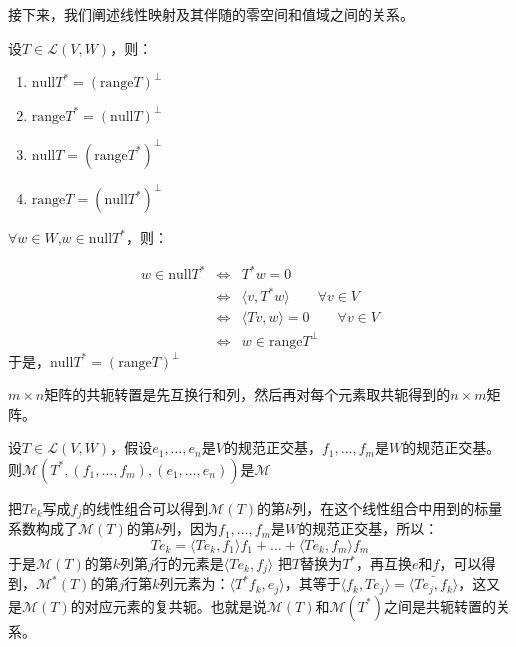 \documentclass[10pt,a4paper,UTF8]{article}
\begin{document}
接下来，我们阐述线性映射及其伴随的零空间和值域之间的关系。
\begin{tikztheorem}
设\(T\in \mathcal{L}(V,W)\)，则：
\begin{enumerate}
\item \(\mathrm{null} T^{*} = (\mathrm{range}T)^{\bot}\)
\item \(\mathrm{range}T^{*} = (\mathrm{null}T)^{\bot}\)
\item \(\mathrm{null}T = (\mathrm{range}T^{*})^{\bot}\)
\item \(\mathrm{range}T = (\mathrm{null}T^{*})^{\bot}\)
\end{enumerate}
\end{tikztheorem}
\begin{tikzproof}
\(\forall w \in W\),\(w\in \mathrm{null}T^{*}\)，则：

\begin{eqnarray}
\label{eq:10}
w\in \mathrm{null}T^{*}&\Leftrightarrow&T^{*}w = 0 \\
&\Leftrightarrow & \langle v,T^{*}w \rangle \qquad \forall v\in V \\
&\Leftrightarrow& \langle Tv,w \rangle =0 \qquad \forall v\in V \\
&\Leftrightarrow& w\in \mathrm{range}T^{\bot}
\end{eqnarray}
于是，\(\mathrm{null}T^{*} = ( \mathrm{range}T )^{\bot}\)
\end{tikzproof}

\begin{definition}
\(m\times n\)矩阵的共轭转置是先互换行和列，然后再对每个元素取共轭得到的\(n\times m\)矩阵。
\end{definition}
\begin{tikztheorem}
设\(T\in \mathcal{L}(V,W)\)，假设\(e_{1},\ldots ,e_{n}\)是\(V\)的规范正交基，\(f_{1},\ldots ,f_{m}\)是\(W\)的规范正交基。则\(\mathcal{M}(T^{*},(f_{1},\ldots ,f_{m}),(e_{1},\ldots ,e_{n}))\)是\(\mathcal{M}\)
\end{tikztheorem}

\begin{tikzproof}
把\(Te_{k}\)写成\(f_{j}\)的线性组合可以得到\(\mathcal{M}(T)\)的第\(k\)列，在这个线性组合中用到的标量系数构成了\(\mathcal{M}(T)\)的第\(k\)列，因为\(f_{1},\ldots ,f_{m}\)是\(W\)的规范正交基，所以：
\begin{equation}
\label{eq:11}
Te_{k} = \langle Te_{k},f_{1} \rangle f_{1} + \ldots + \langle T{e_{k}},f_{m} \rangle f_{m}
\end{equation}
于是\(\mathcal{M}(T)\)的第\(k\)列第\(j\)行的元素是\(\langle Te_{k},f_{j} \rangle\)
把\(T\)替换为\(T^{*}\)，再互换\(e\)和\(f\)，可以得到，\(\mathcal{M}^{*}(T)\)的第\(j\)行第\(k\)列元素为：\(\langle T^{*}f_{k}, e_{j} \rangle\)，其等于\(\langle f_{k}, T e_{j} \rangle = \bar{ \langle Te_{j},f_{k} \rangle  }\)，这又是\(\mathcal{M}(T)\)的对应元素的复共轭。也就是说\(\mathcal{M}(T)\)和\(\mathcal{M}(T^{*})\)之间是共轭转置的关系。
\end{tikzproof}
\end{document}
